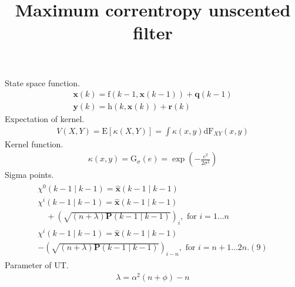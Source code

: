 \documentclass[dvipdfmx]{jsarticle}
\begin{document}
\title{Maximum correntropy unscented filter}           %
\maketitle                                 %
State space function.
\begin{equation}\label{Func.}\begin{aligned}
    \mathbf{x}(k)=\mathrm{f}(k-1, \mathbf{x}(k-1))+\mathbf{q}(k-1) \\
    \mathbf{y}(k)=\mathrm{h}(k, \mathbf{x}(k))+\mathbf{r}(k)
\end{aligned}\end{equation}
Expectation of kernel.
\begin{equation}\label{Func.}\begin{aligned}
    V(X, Y)=\mathrm{E}[\kappa(X, Y)]=\int \kappa(x, y) \mathrm{d} \mathrm{F}_{X Y}(x, y)
\end{aligned}\end{equation}
Kernel function.
\begin{equation}\label{Func.}\begin{aligned}
    \kappa(x, y)=\mathrm{G}_{\sigma}(e)=\exp \left(-\frac{e^{2}}{2 \sigma^{2}}\right)
\end{aligned}\end{equation}
Sigma points.
\begin{equation}\label{Func.}\begin{aligned}
    \begin{array}{l}
        \chi^{0}(k-1 \mid k-1)=\widehat{\mathbf{x}}(k-1 \mid k-1) \\
        \chi^{i}(k-1 \mid k-1)=\widehat{\mathbf{x}}(k-1 \mid k-1) \\
        \quad+(\sqrt{(n+\lambda) \mathbf{P}(k-1 \mid k-1)})_{i}, \text { for } i=1 \ldots n \\
        \chi^{i}(k-1 \mid k-1)=\widehat{\mathbf{x}}(k-1 \mid k-1) \\
        -(\sqrt{(n+\lambda) \mathbf{P}(k-1 \mid k-1)})_{i-n}, \text { for } i=n+1 \ldots 2 n .(9)
        \end{array}
\end{aligned}\end{equation}
Parameter of UT.
\begin{equation}\label{Func.}\begin{aligned}
    \lambda=\alpha^{2}(n+\phi)-n
\end{aligned}\end{equation}
\end{document}
